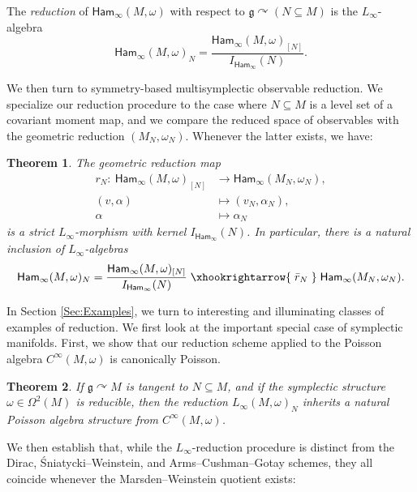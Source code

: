 \documentclass[10pt,a4paper]{amsart}
\numberwithin{equation}{section}
\newtheorem{Theorem}{Theorem}[section]
\newcommand{\g}{\mathfrak{g}}
\newcommand{\Ham}{\mathsf{Ham}}
\renewcommand{\subset}{\subseteq}
\begin{document}
\setcounter{section}{2}
\setcounter{Theorem}{20}
\begin{Definition}
	The \emph{reduction} of $\Ham_\infty(M,\omega)$ with respect to $\g\curvearrowright (N\subset M)$ is the $L_\infty$-algebra
	\[
	\Ham_\infty(M,\omega)_N = \frac{\Ham_\infty(M,\omega)_{[N]}}{I_{\Ham_\infty}(N)}.
	\]
\end{Definition}

We then turn to symmetry-based multisymplectic observable reduction. We specialize our reduction procedure to the case where $N\subset M$ is a level set of a covariant moment map, and we compare the reduced space of observables with the geometric reduction $(M_N,\omega_N)$. Whenever the latter exists, we have:

\setcounter{section}{2}
\setcounter{Theorem}{37}
\begin{Theorem}
	The geometric reduction map
	\begin{align*}
		r_N\colon \	\Ham_\infty(M,\omega)_{[N]}	&\to		\Ham_\infty(M_N,\omega_N),		\\
		(v,\alpha)			&\mapsto	(v_N,\alpha_N)	,		\\
		\alpha		&\mapsto	\alpha_N
	\end{align*}
	is a strict $L_\infty$-morphism with kernel $I_{\Ham_\infty}(N)$. In particular, there is a natural inclusion of $L_\infty$-algebras
	\[
	\Ham_\infty(M,\omega)_N = \frac{\Ham_\infty(M,\omega)_{[N]}}{I_{\Ham_\infty}(N)} \;\xhookrightarrow{\;\bar{r}_N\;}\; \Ham_\infty(M_N,\omega_N).
	\]
\end{Theorem}

In Section \ref{Sec:Examples}, we turn to interesting and illuminating classes of examples of reduction. We first look at the important special case of symplectic manifolds. First, we show that our reduction scheme applied to the Poisson algebra $C^\infty(M,\omega)$ is canonically Poisson.

\setcounter{section}{3}
\setcounter{Theorem}{0}
\begin{Theorem}
	If $\g\curvearrowright M$ is tangent to $N\subset M$, and if the symplectic structure $\omega\in\Omega^2(M)$ is reducible, then the reduction $L_\infty(M,\omega)_N$ inherits a natural Poisson algebra structure from $C^\infty(M,\omega)$.
\end{Theorem}

We then establish that, while the $L_\infty$-reduction procedure is distinct from the Dirac, \'Snia\-tycki--Weinstein, and Arms--Cushman--Gotay schemes, they all coincide whenever the Marsden--Wein\-stein quotient exists:
\end{document}

